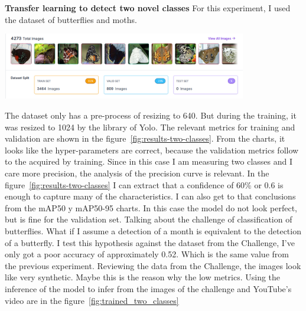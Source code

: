 \documentclass{cpsc202}
\begin{document}
    \newpage
    \textbf{Transfer learning to detect two novel classes}
    For this experiment, I used the dataset of butterflies and moths.
    \begin{center}
        \includegraphics[width=0.8\textwidth]{trained_two_classes/dataset_two_classes}
    \end{center}
    The dataset only has a pre-process of resizing to 640.
    But during the training, it was resized to 1024 by the library of Yolo.
    The relevant metrics for training and validation are shown in the figure~\ref{fig:results-two-classes}.
    From the charts, it looks like the hyper-parameters are correct, because the validation metrics follow to the acquired by training.
    Since in this case I am measuring two classes and I care more precision, the analysis of the precision curve is relevant.
    In the figure~\ref{fig:results-two-classes} I can extract that a confidence of 60\% or 0.6 is enough to capture many of the characteristics.
    I can also get to that conclusions from the mAP50 y mAP50-95 charts.
    In this case the model do not look perfect, but is fine for the validation set.
    Talking about the challenge of classification of butterflies.
    What if I assume a detection of a month is equivalent to the detection of a butterfly.
    I test this hypothesis against the dataset from the Challenge, I've only got a poor accuracy of approximately 0.52.
    Which is the same value from the previous experiment.
    Reviewing the data from the Challenge, the images look like very synthetic.
    Maybe this is the reason why the low metrics.
    Using the inference of the model to infer from the images of the challenge and YouTube's video are in the figure~\ref{fig:trained_two_classes}
\end{document}
